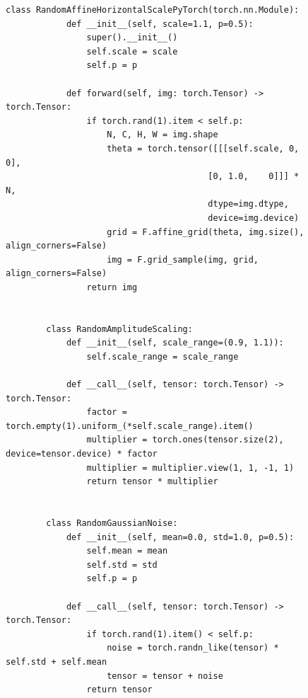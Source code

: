 \begin{figure}[htbp]
  \centering
  \begin{minipage}{\linewidth}
    \begin{lstlisting}[style=pythonstyle, caption={Custom data augmentation modules}, label=lst:custom_augmentations]
        class RandomAffineHorizontalScalePyTorch(torch.nn.Module):
            def __init__(self, scale=1.1, p=0.5):
                super().__init__()
                self.scale = scale
                self.p = p
                
            def forward(self, img: torch.Tensor) -> torch.Tensor:
                if torch.rand(1).item < self.p:
                    N, C, H, W = img.shape
                    theta = torch.tensor([[[self.scale, 0, 0],
                                        [0, 1.0,    0]]] * N,
                                        dtype=img.dtype,
                                        device=img.device)
                    grid = F.affine_grid(theta, img.size(), align_corners=False)
                    img = F.grid_sample(img, grid, align_corners=False)
                return img
        
        
        class RandomAmplitudeScaling:
            def __init__(self, scale_range=(0.9, 1.1)):
                self.scale_range = scale_range
            
            def __call__(self, tensor: torch.Tensor) -> torch.Tensor:
                factor = torch.empty(1).uniform_(*self.scale_range).item()
                multiplier = torch.ones(tensor.size(2), device=tensor.device) * factor
                multiplier = multiplier.view(1, 1, -1, 1)
                return tensor * multiplier
        
        
        class RandomGaussianNoise:
            def __init__(self, mean=0.0, std=1.0, p=0.5):
                self.mean = mean
                self.std = std
                self.p = p  
        
            def __call__(self, tensor: torch.Tensor) -> torch.Tensor:
                if torch.rand(1).item() < self.p:
                    noise = torch.randn_like(tensor) * self.std + self.mean
                    tensor = tensor + noise
                return tensor
    \end{lstlisting}
  \end{minipage}
\end{figure}

